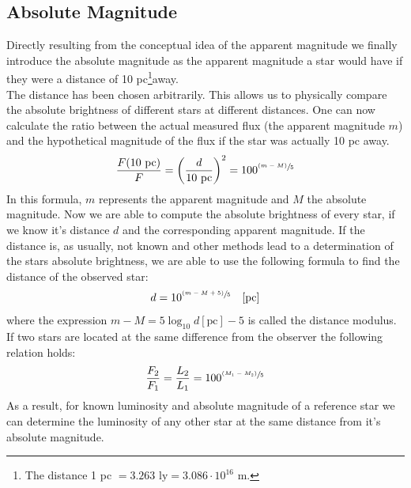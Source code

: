 \subsection{Absolute Magnitude}
Directly resulting from the conceptual idea of the apparent magnitude we finally introduce the absolute magnitude as the apparent magnitude a star would have if they were a distance of 10 pc\footnote{The distance 1 pc $= 3.263 \text{ ly} = 3.086 \cdot 10^{16}$ m.}away. \\
The distance has been chosen arbitrarily. This allows us to physically compare the absolute brightness of different stars at different distances. One can now calculate the ratio between the actual measured flux (the apparent magnitude $m$) and the hypothetical magnitude of the flux if the star was actually 10 pc away. 
\begin{align}
	\frac{F(10 \text{ pc})}{F} = \left( \frac{d}{10 \text{ pc}} \right)^2 = 100^{\sfrac{(m-M)}{5}}
\end{align}
In this formula, $m$ represents the apparent magnitude and $M$ the absolute magnitude. Now we are able to compute the absolute brightness of every star, if we know it's distance $d$ and the corresponding apparent magnitude. If the distance is, as usually, not known and other methods lead to a determination of the stars absolute brightness, we are able to use the following formula to find the distance of the observed star:
\begin{align}
	d = 10^{\sfrac{(m-M+5)}{5}} \quad [\text{pc}]
\end{align}
where the expression $m-M = 5\operatorname{log}_{10} d[\text{pc}] - 5$ is called the distance modulus. \\
If two stars are located at the same difference from the observer the following relation holds: 
\begin{align}
	\frac{F_2}{F_1} = \frac{L_2}{L_1} = 100^{\sfrac{(M_1-M_2)}{5}}
\end{align}
As a result, for known luminosity and absolute magnitude of a reference star we can determine the luminosity of any other star at the same distance from it's absolute magnitude.
